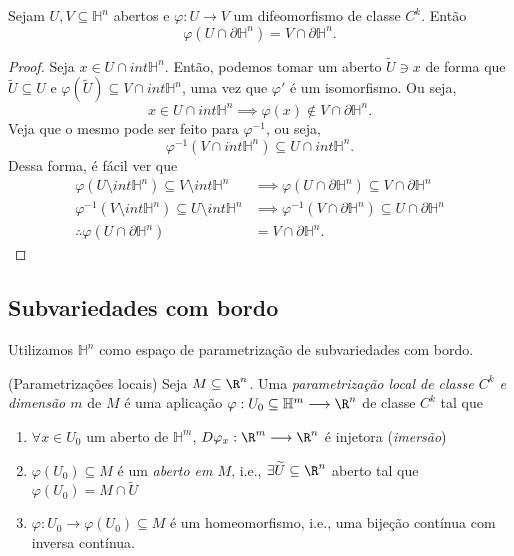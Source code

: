 \begin{theorem}
    Sejam $U,V \subseteq \mathbb{H}^{n}$ abertos e $\varphi : U \longrightarrow V$ um difeomorfismo de classe $C^{k}$. Então \[
    \varphi \left( U\cap \partial \mathbb{H}^{n} \right) = V\cap \partial \mathbb{H}^{n}
    .\] 
\end{theorem}

\begin{proof}
    Seja $x\in U\cap int \mathbb{H}^{n}$. Então, podemos tomar um aberto $\widetilde{U} \ni x$ de forma que $\widetilde{U}\subseteq U$ e $\varphi ( \widetilde{U} ) \subseteq V \cap int \mathbb{H}^{n}$, uma vez que $\varphi' $ é um isomorfismo. Ou seja, \[
    x\in U\cap int \mathbb{H}^{n} \implies \varphi \left( x \right) \not\in V\cap \partial \mathbb{H}^{n}
    .\] Veja que o mesmo pode ser feito para $\varphi ^{-1}$, ou seja, \[
    \varphi^{-1} \left( V\cap int \mathbb{H}^{n} \right) \subseteq U\cap int \mathbb{H}^{n}
    .\] Dessa forma, é fácil ver que 
    \begin{align*}
	\varphi \left( U\setminus int \mathbb{H}^{n} \right) \subseteq V\setminus int \mathbb{H}^{n} &\implies \varphi \left( U\cap \partial \mathbb{H}^{n} \right) \subseteq V\cap \partial  \mathbb{H}^{n} \\
	\varphi^{-1} \left( V\setminus int \mathbb{H}^{n} \right) \subseteq U\setminus int \mathbb{H}^{n} &\implies \varphi^{-1} \left( V\cap \partial \mathbb{H}^{n} \right) \subseteq U\cap \partial  \mathbb{H}^{n} \\
	 \therefore \varphi \left( U\cap \partial \mathbb{H}^{n} \right) &= V\cap \partial \mathbb{H}^{n}
    .\end{align*}
\end{proof}

\subsection*{Subvariedades com bordo}

Utilizamos $\mathbb{H}^{n}$ como espaço de parametrização de subvariedades com bordo.

\begin{definition}
    (Parametrizações locais) Seja $M\subseteq\R^{n}$. Uma \emph{parametrização local de classe $C^{k}$ e dimensão $m$} de $M$ é uma aplicação $\varphi : U_0\subseteq\mathbb{H}^{m} \longrightarrow \R^{n}$ de classe $C^{k}$ tal que 
    \begin{enumerate}
	\item $\forall x\in U_0$ um aberto de $\mathbb{H}^{m}$, $D\varphi _{x}: \R^{m} \longrightarrow \R^{n}$ é injetora (\emph{imersão})
	\item $\varphi \left( U_0 \right) \subseteq M$ é um \emph{aberto em $M$}, i.e., $\exists \widetilde{U}\subseteq\R^{n}$ aberto tal que $\varphi \left( U_0 \right) =M\cap \widetilde{U}$
	\item $\varphi : U_0 \longrightarrow \varphi \left( U_0 \right) \subseteq M$ é um homeomorfismo, i.e., uma bijeção contínua com inversa contínua.
    \end{enumerate}
\end{definition}

